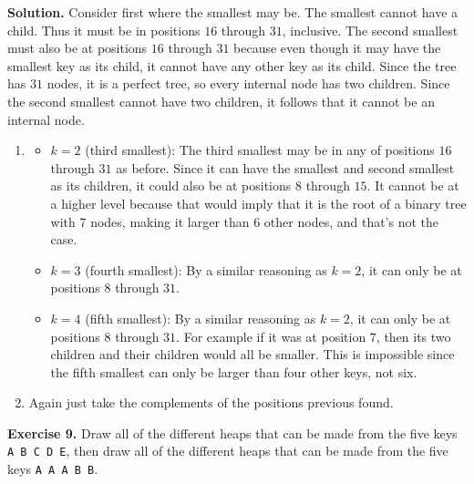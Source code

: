 \documentclass[12pt, a4paper]{article}
\newenvironment{ex}[2][Exercise]
{\par\medskip\noindent \textbf{#1 #2.}}
{\medskip}
\newenvironment{sol}[1][Solution]
{\par\medskip\noindent \textbf{#1.} }
{\medskip}
\begin{document}
	\begin{sol}
		Consider first where the smallest may be. The smallest cannot have a child.
		Thus  it must be in positions $16$ through $31$, inclusive. The second smallest
		must also be at positions $16$ through $31$ because even though it may have the
		smallest key as its child, it cannot have any other key as its child.
		Since the tree has $31$ nodes, it is a perfect tree, so every internal node
		has two children. Since the second smallest cannot have two children,
		it follows that it cannot be an internal node.
		\begin{enumerate}[label=(\roman*)]
			\item \begin{itemize}
				\item $k=2$ (third smallest): The third smallest may be in any of
				positions $16$ through $31$ as before. Since it can have the smallest
				and second smallest as its children, it could also be at positions
				$8$ through $15$. It cannot be at a higher level because that would
				imply that it is the root of a binary tree with 7 nodes, making it
				larger than 6 other nodes, and that's not the case.
				\item $k=3$ (fourth smallest): By a similar reasoning as $k=2$,
				it can only be at positions $8$ through $31$.
				\item $k=4$ (fifth smallest): By a similar reasoning as $k=2$,
				it can only be at positions $8$ through $31$. For example if it
				was at position $7$, then its two children and their children would
				all be smaller. This is impossible since the fifth smallest can only
				be larger than four other keys, not six.
			\end{itemize}
			\item Again just take the complements of the positions previous found.
		\end{enumerate}
	\end{sol}
	\begin{ex}{9}
		Draw all of the different heaps that can be made from the five keys
		\texttt{A B C D E}, then draw all of the different heaps that can be made from
		the five keys \texttt{A A A B B}.
	\end{ex}
\end{document}
